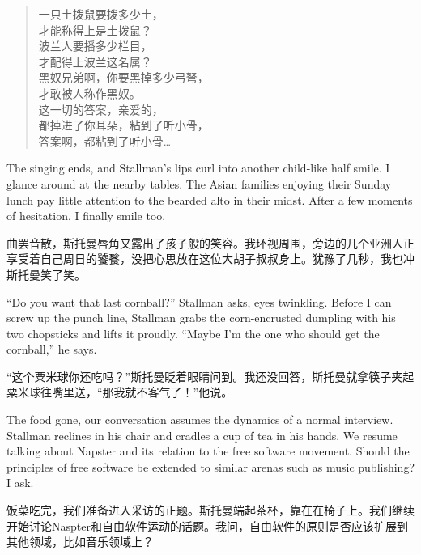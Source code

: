 \ifdefined\chs
\begin{verse}
一只土拨鼠要拨多少土，\\
才能称得上是土拨鼠？\\
波兰人要播多少栏目，\\
才配得上波兰这名属？\\
黑奴兄弟啊，你要黑掉多少弓弩，\\
才敢被人称作黑奴。\\
这一切的答案，亲爱的，\\
都掉进了你耳朵，粘到了听小骨，\\
答案啊，都粘到了听小骨\ldots
\end{verse}
\fi

\ifdefined\eng
The singing ends, and Stallman's lips curl into another child-like half smile. I glance around at the nearby tables. The Asian families enjoying their Sunday lunch pay little attention to the bearded alto in their midst. After a few moments of hesitation, I finally smile too.
\fi

\ifdefined\chs
曲罢音散，斯托曼唇角又露出了孩子般的笑容。我环视周围，旁边的几个亚洲人正享受着自己周日的饕餮，没把心思放在这位大胡子叔叔身上。犹豫了几秒，我也冲斯托曼笑了笑。
\fi

\ifdefined\eng
``Do you want that last cornball?'' Stallman asks, eyes twinkling. Before I can screw up the punch line, Stallman grabs the corn-encrusted dumpling with his two chopsticks and lifts it proudly. ``Maybe I'm the one who should get the cornball,'' he says.
\fi

\ifdefined\chs
``这个粟米球你还吃吗？''斯托曼眨着眼睛问到。我还没回答，斯托曼就拿筷子夹起粟米球往嘴里送，``那我就不客气了！''他说。
\fi

\ifdefined\eng
The food gone, our conversation assumes the dynamics of a normal interview. Stallman reclines in his chair and cradles a cup of tea in his hands. We resume talking about Napster and its relation to the free software movement. Should the principles of free software be extended to similar arenas such as music publishing? I ask.
\fi

\ifdefined\chs
饭菜吃完，我们准备进入采访的正题。斯托曼端起茶杯，靠在在椅子上。我们继续开始讨论Naspter和自由软件运动的话题。我问，自由软件的原则是否应该扩展到其他领域，比如音乐领域上？
\fi

